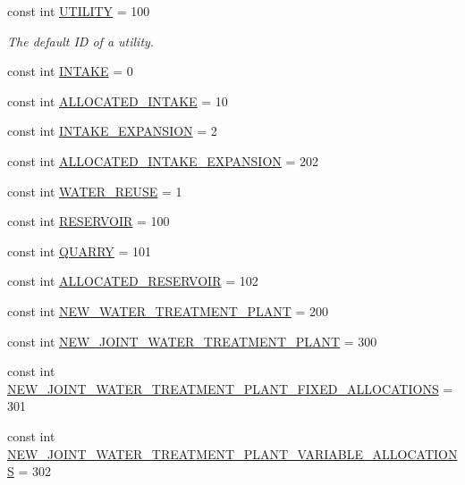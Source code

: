 \begin{DoxyCompactItemize}
const int \mbox{\hyperlink{classConstants_a5ea4764afe0d01f0a38edfd66e806710}{U\+T\+I\+L\+I\+TY}} = 100
\begin{DoxyCompactList}\small\item\em The default ID of a utility. \end{DoxyCompactList}\item 
const int \mbox{\hyperlink{classConstants_adb591bf3b5663c16cf71d3cbb044c3b3}{I\+N\+T\+A\+KE}} = 0
\item 
const int \mbox{\hyperlink{classConstants_ac4de198cacb903f882cdc87818316bfb}{A\+L\+L\+O\+C\+A\+T\+E\+D\+\_\+\+I\+N\+T\+A\+KE}} = 10
\item 
const int \mbox{\hyperlink{classConstants_abb277ef800bc58d200c401e8bd00ac72}{I\+N\+T\+A\+K\+E\+\_\+\+E\+X\+P\+A\+N\+S\+I\+ON}} = 2
\item 
const int \mbox{\hyperlink{classConstants_acc418f3316f985bab98c8e43b8be851c}{A\+L\+L\+O\+C\+A\+T\+E\+D\+\_\+\+I\+N\+T\+A\+K\+E\+\_\+\+E\+X\+P\+A\+N\+S\+I\+ON}} = 202
\item 
const int \mbox{\hyperlink{classConstants_aebb21b9413741e893ea6a79e379e9ec6}{W\+A\+T\+E\+R\+\_\+\+R\+E\+U\+SE}} = 1
\item 
const int \mbox{\hyperlink{classConstants_a127d57d404f178c91f8ed88823e24088}{R\+E\+S\+E\+R\+V\+O\+IR}} = 100
\item 
const int \mbox{\hyperlink{classConstants_ac5f85f1f073e01d6d42ac8b19fc73f1e}{Q\+U\+A\+R\+RY}} = 101
\item 
const int \mbox{\hyperlink{classConstants_a2769e2f1bc080457c78297402e78c8d1}{A\+L\+L\+O\+C\+A\+T\+E\+D\+\_\+\+R\+E\+S\+E\+R\+V\+O\+IR}} = 102
\item 
const int \mbox{\hyperlink{classConstants_a6166f1b56ea9e9bfd63ac77cb99da31a}{N\+E\+W\+\_\+\+W\+A\+T\+E\+R\+\_\+\+T\+R\+E\+A\+T\+M\+E\+N\+T\+\_\+\+P\+L\+A\+NT}} = 200
\item 
const int \mbox{\hyperlink{classConstants_a03285d30f40e59235e2a22e03373adc0}{N\+E\+W\+\_\+\+J\+O\+I\+N\+T\+\_\+\+W\+A\+T\+E\+R\+\_\+\+T\+R\+E\+A\+T\+M\+E\+N\+T\+\_\+\+P\+L\+A\+NT}} = 300
\item 
const int \mbox{\hyperlink{classConstants_a303fe9105056b05e2ee7b7612949aca9}{N\+E\+W\+\_\+\+J\+O\+I\+N\+T\+\_\+\+W\+A\+T\+E\+R\+\_\+\+T\+R\+E\+A\+T\+M\+E\+N\+T\+\_\+\+P\+L\+A\+N\+T\+\_\+\+F\+I\+X\+E\+D\+\_\+\+A\+L\+L\+O\+C\+A\+T\+I\+O\+NS}} = 301
\item 
const int \mbox{\hyperlink{classConstants_a5e1282af581acbba5686b4179bb22bce}{N\+E\+W\+\_\+\+J\+O\+I\+N\+T\+\_\+\+W\+A\+T\+E\+R\+\_\+\+T\+R\+E\+A\+T\+M\+E\+N\+T\+\_\+\+P\+L\+A\+N\+T\+\_\+\+V\+A\+R\+I\+A\+B\+L\+E\+\_\+\+A\+L\+L\+O\+C\+A\+T\+I\+O\+NS}} = 302

\end{DoxyCompactItemize}
